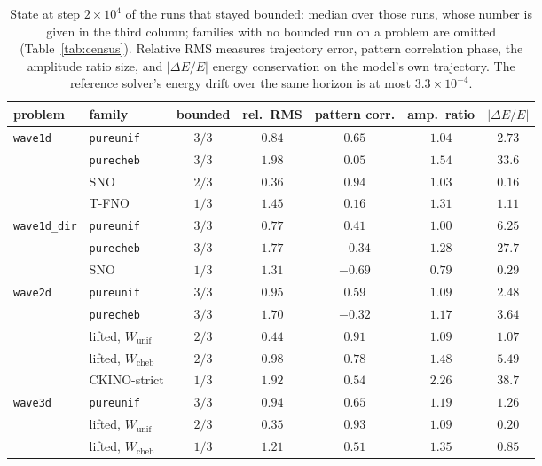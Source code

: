 \documentclass[11pt]{article}
\theoremstyle{definition}
\theoremstyle{remark}
\newcommand{\Wc}{W_{\mathrm{cheb}}}
\newcommand{\Wu}{W_{\mathrm{unif}}}
\newcommand{\ckino}{\textsc{CKINO}}
\begin{document}
\begin{table}[htbp]
\centering
\caption{State at step $2\times10^{4}$ of the runs that stayed bounded: median
over those runs, whose number is given in the third column; families with no
bounded run on a problem are omitted (Table~\ref{tab:census}). Relative RMS
measures trajectory error, pattern correlation phase, the amplitude ratio size,
and $|\Delta E/E|$ energy conservation on the model's own trajectory. The
reference solver's energy drift over the same horizon is at most
$3.3\times10^{-4}$.}
\label{tab:long}
\small
\begin{tabular}{@{}llccccc@{}}
\toprule
problem & family & bounded & rel.\ RMS & pattern corr. & amp.\ ratio & $|\Delta E/E|$ \\
\midrule
\multirow{4}{*}{\texttt{wave1d}}
 & \texttt{pureunif} & $3/3$ & $0.84$ & $0.65$ & $1.04$ & $2.73$ \\
 & \texttt{purecheb} & $3/3$ & $1.98$ & $0.05$ & $1.54$ & $33.6$ \\
 & SNO & $2/3$ & $0.36$ & $0.94$ & $1.03$ & $0.16$ \\
 & T-FNO & $1/3$ & $1.45$ & $0.16$ & $1.31$ & $1.11$ \\
\midrule
\multirow{3}{*}{\texttt{wave1d\_dir}}
 & \texttt{pureunif} & $3/3$ & $0.77$ & $0.41$ & $1.00$ & $6.25$ \\
 & \texttt{purecheb} & $3/3$ & $1.77$ & $-0.34$ & $1.28$ & $27.7$ \\
 & SNO & $1/3$ & $1.31$ & $-0.69$ & $0.79$ & $0.29$ \\
\midrule
\multirow{5}{*}{\texttt{wave2d}}
 & \texttt{pureunif} & $3/3$ & $0.95$ & $0.59$ & $1.09$ & $2.48$ \\
 & \texttt{purecheb} & $3/3$ & $1.70$ & $-0.32$ & $1.17$ & $3.64$ \\
 & lifted, $\Wu$ & $2/3$ & $0.44$ & $0.91$ & $1.09$ & $1.07$ \\
 & lifted, $\Wc$ & $2/3$ & $0.98$ & $0.78$ & $1.48$ & $5.49$ \\
 & \ckino{}-strict & $1/3$ & $1.92$ & $0.54$ & $2.26$ & $38.7$ \\
\midrule
\multirow{3}{*}{\texttt{wave3d}}
 & \texttt{pureunif} & $3/3$ & $0.94$ & $0.65$ & $1.19$ & $1.26$ \\
 & lifted, $\Wu$ & $2/3$ & $0.35$ & $0.93$ & $1.09$ & $0.20$ \\
 & lifted, $\Wc$ & $1/3$ & $1.21$ & $0.51$ & $1.35$ & $0.85$ \\
\bottomrule
\end{tabular}
\end{table}
\end{document}
